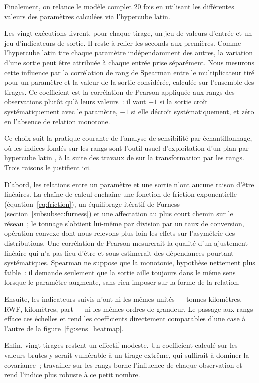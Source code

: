 \documentclass[12pt,a4paper,french]{report}
\begin{document}
	Finalement, on relance le modèle complet 20 fois en utilisant les différentes valeurs des paramètres calculées via l'hypercube latin.
	
	\medskip
	Les vingt exécutions livrent, pour chaque tirage, un jeu de valeurs d'entrée et un jeu d'indicateurs de sortie. Il reste à relier les seconds aux premières. Comme l'hypercube latin tire chaque paramètre indépendamment des autres, la variation d'une sortie peut être attribuée à chaque entrée prise séparément. Nous mesurons cette influence par la corrélation de rang de Spearman entre le multiplicateur tiré pour un paramètre et la valeur de la sortie considérée, calculée sur l'ensemble des tirages. Ce coefficient est la corrélation de Pearson appliquée aux rangs des observations plutôt qu'à leurs valeurs~: il vaut $+1$ si la sortie croît systématiquement avec le paramètre, $-1$ si elle décroît systématiquement, et zéro en l'absence de relation monotone.
	
	Ce choix suit la pratique courante de l'analyse de sensibilité par échantillonnage, où les indices fondés sur les rangs sont l'outil usuel d'exploitation d'un plan par hypercube latin \parencite{HeltonDavis2003}, à la suite des travaux de \cite{ImanConover1979} sur la transformation par les rangs. Trois raisons le justifient ici.
	
	D'abord, les relations entre un paramètre et une sortie n'ont aucune raison d'être linéaires. La chaîne de calcul enchaîne une fonction de friction exponentielle (équation~\ref{eq:friction}), un équilibrage itératif de Furness (section~\ref{subsubsec:furness}) et une affectation au plus court chemin sur le réseau~; le tonnage s'obtient lui-même par division par un taux de conversion, opération convexe dont nous relevons plus loin les effets sur l'asymétrie des distributions. Une corrélation de Pearson mesurerait la qualité d'un ajustement linéaire qui n'a pas lieu d'être et sous-estimerait des dépendances pourtant systématiques. Spearman ne suppose que la monotonie, hypothèse nettement plus faible~: il demande seulement que la sortie aille toujours dans le même sens lorsque le paramètre augmente, sans rien imposer sur la forme de la relation.
	
	Ensuite, les indicateurs suivis n'ont ni les mêmes unités — tonnes-kilomètres, RWF, kilomètres, part — ni les mêmes ordres de grandeur. Le passage aux rangs efface ces échelles et rend les coefficients directement comparables d'une case à l'autre de la figure~\ref{fig:sens_heatmap}.
	
	Enfin, vingt tirages restent un effectif modeste. Un coefficient calculé sur les valeurs brutes y serait vulnérable à un tirage extrême, qui suffirait à dominer la covariance~; travailler sur les rangs borne l'influence de chaque observation et rend l'indice plus robuste à ce petit nombre.
	
\end{document}
